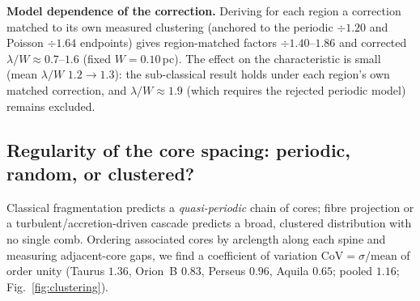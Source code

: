 \documentclass[usenatbib,twoside,twocolumn]{mnras}
\begin{document}
\smallskip\noindent\textbf{Model dependence of the correction.}\label{sec:injection_recovery_model}
Deriving for each region a correction matched to its own measured clustering (anchored to the periodic $\div1.20$ and Poisson $\div1.64$ endpoints) gives region-matched factors $\div1.40$--$1.86$ and corrected $\lambda/W\approx0.7$--$1.6$ (fixed $W=0.10$\,pc). The effect on the characteristic is small (mean $\lambda/W$ $1.2\to1.3$): the sub-classical result holds under each region's own matched correction, and $\lambda/W\approx1.9$ (which requires the rejected periodic model) remains excluded.

\subsection{Regularity of the core spacing: periodic, random, or clustered?}
\label{sec:clustering}
Classical fragmentation predicts a \emph{quasi-periodic} chain of cores; fibre projection or a turbulent/accretion-driven cascade predicts a broad, clustered distribution with no single comb. Ordering associated cores by arclength along each spine and measuring adjacent-core gaps, we find a coefficient of variation $\mathrm{CoV}=\sigma/\mathrm{mean}$ of order unity (Taurus $1.36$, Orion~B $0.83$, Perseus $0.96$, Aquila $0.65$; pooled $1.16$; Fig.~\ref{fig:clustering}).
\end{document}
